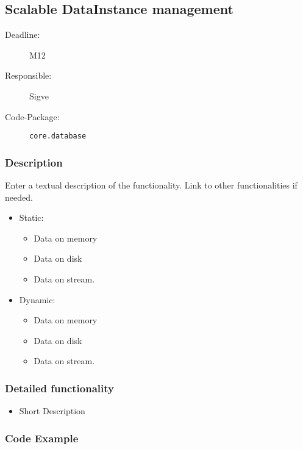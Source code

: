 \newpage
\subsection{Scalable DataInstance management}
\label{Functionality:ID}

\begin{description}
\item[Deadline:] M12
\item[Responsible:] Sigve
\item[Code-Package:] \texttt{core.database}
\end{description}

\subsubsection*{Description}

Enter a textual description of the functionality. Link to other functionalities if needed. 

\begin{itemize}
\item Static:

\begin{itemize}
\item Data on memory
\item Data on disk
\item Data on stream.
\end{itemize}
\item Dynamic:
\begin{itemize}
\item Data on memory
\item Data on disk
\item Data on stream.
\end{itemize}
\end{itemize}

\subsubsection*{Detailed functionality}

\begin{itemize}
\item Short Description
\end{itemize}

\subsubsection*{Code Example}


